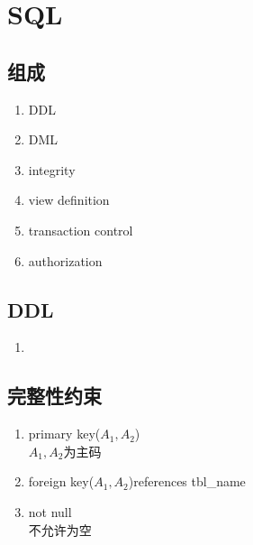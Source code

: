 \documentclass[UTF8]{article}
\begin{document}

\section{SQL}
\subsection{组成}
\begin{enumerate}
	\item DDL
	\item DML
	\item integrity
	\item view definition
	\item transaction control
	\item authorization
\end{enumerate}

\subsection{DDL}
\begin{enumerate}
	\item 
\end{enumerate}
\subsection{完整性约束}
\begin{enumerate}
	\item primary key($A_{1},A_{2}$)\\
	$A_{1},A_{2}$为主码
	\item foreign key($A_{1},A_{2}$)references tbl_name	
	\item not null \\
	不允许为空
\end{enumerate}
\end{document}
